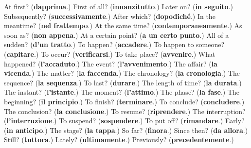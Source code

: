 \begin{tcolorbox}[breakable,colback=teal!4,colframe=teal!35!black,title={Before you move on}]
At first? (\textbf{dapprima}.) First of all? (\textbf{innanzitutto}.) Later on? (\textbf{in seguito}.) Subsequently? (\textbf{successivamente}.) After which? (\textbf{dopodiché}.) In the meantime? (\textbf{nel frattempo}.) At the same time? (\textbf{contemporaneamente}.) As soon as? (\textbf{non appena}.) At a certain point? (\textbf{a un certo punto}.) All of a sudden? (\textbf{d'un tratto}.) To happen? (\textbf{accadere}.) To happen to someone? (\textbf{capitare}.) To occur? (\textbf{verificarsi}.) To take place? (\textbf{avvenire}.) What happened? (\textbf{l'accaduto}.) The event? (\textbf{l'avvenimento}.) The affair? (\textbf{la vicenda}.) The matter? (\textbf{la faccenda}.) The chronology? (\textbf{la cronologia}.) The sequence? (\textbf{la sequenza}.) To last? (\textbf{durare}.) The length of time? (\textbf{la durata}.) The instant? (\textbf{l'istante}.) The moment? (\textbf{l'attimo}.) The phase? (\textbf{la fase}.) The beginning? (\textbf{il principio}.) To finish? (\textbf{terminare}.) To conclude? (\textbf{concludere}.) The conclusion? (\textbf{la conclusione}.) To resume? (\textbf{riprendere}.) The interruption? (\textbf{l'interruzione}.) To suspend? (\textbf{sospendere}.) To put off? (\textbf{rimandare}.) Early? (\textbf{in anticipo}.) The stage? (\textbf{la tappa}.) So far? (\textbf{finora}.) Since then? (\textbf{da allora}.) Still? (\textbf{tuttora}.) Lately? (\textbf{ultimamente}.) Previously? (\textbf{precedentemente}.)
\end{tcolorbox}
